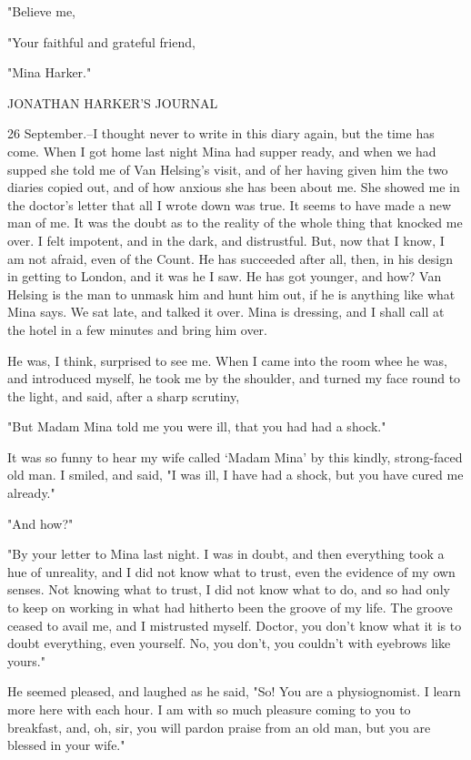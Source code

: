 "Believe me, 

"Your faithful and grateful friend, 

"Mina Harker." 

JONATHAN HARKER'S JOURNAL 

26 September.--I thought never to write in this diary again, but the time has come. When I got home last night Mina had supper ready, and when we had supped she told me of Van Helsing's visit, and of her having given him the two diaries copied out, and of how anxious she has been about me. She showed me in the doctor's letter that all I wrote down was true. It seems to have made a new man of me. It was the doubt as to the reality of the whole thing that knocked me over. I felt impotent, and in the dark, and distrustful. But, now that I know, I am not afraid, even of the Count. He has succeeded after all, then, in his design in getting to London, and it was he I saw. He has got younger, and how? Van Helsing is the man to unmask him and hunt him out, if he is anything like what Mina says. We sat late, and talked it over. Mina is dressing, and I shall call at the hotel in a few minutes and bring him over. 

He was, I think, surprised to see me. When I came into the room whee he was, and introduced myself, he took me by the shoulder, and turned my face round to the light, and said, after a sharp scrutiny, 

"But Madam Mina told me you were ill, that you had had a shock." 

It was so funny to hear my wife called `Madam Mina' by this kindly, strong-faced old man. I smiled, and said, "I was ill, I have had a shock, but you have cured me already." 

"And how?" 

"By your letter to Mina last night. I was in doubt, and then everything took a hue of unreality, and I did not know what to trust, even the evidence of my own senses. Not knowing what to trust, I did not know what to do, and so had only to keep on working in what had hitherto been the groove of my life. The groove ceased to avail me, and I mistrusted myself. Doctor, you don't know what it is to doubt everything, even yourself. No, you don't, you couldn't with eyebrows like yours." 

He seemed pleased, and laughed as he said, "So! You are a physiognomist. I learn more here with each hour. I am with so much pleasure coming to you to breakfast, and, oh, sir, you will pardon praise from an old man, but you are blessed in your wife." 

